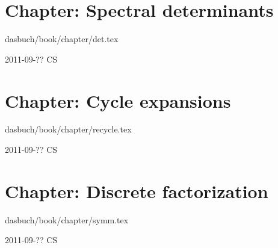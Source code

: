 \section{Chapter: Spectral determinants}
\label{c-det}\noindent dasbuch/book/chapter/det.tex
\begin{description}\item[2011-09-?? CS]

\end{description}

\section{Chapter: Cycle expansions}
\label{c-recycle}\noindent dasbuch/book/chapter/recycle.tex
\begin{description}\item[2011-09-?? CS]

\end{description}

\section{Chapter: Discrete factorization}
\label{c-symm}\noindent dasbuch/book/chapter/symm.tex
\begin{description}\item[2011-09-?? CS]

\end{description}

%
%
%
%
%
%
%
%


